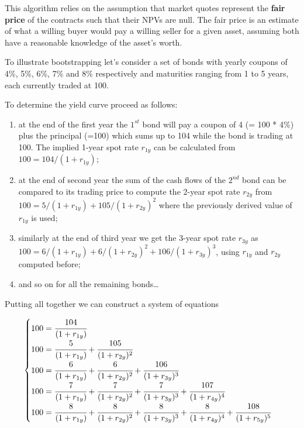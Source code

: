 This algorithm relies on the assumption that market quotes represent the \textbf{fair price} of the contracts such that their NPVs are null. The fair price is an estimate of what a willing buyer would pay a willing seller for a given asset, assuming both have a reasonable knowledge of the asset's worth.

To illustrate bootstrapping let's consider a set of bonds with yearly coupons of 4\%, 5\%, 6\%, 7\% and 8\% respectively and maturities ranging from 1 to 5 years, each currently traded at 100.

To determine the yield curve proceed as follows:
\begin{enumerate}
\item at the end of the first year the $1^{st}$ bond will pay a coupon of 4 (= 100 * 4\%) plus the principal (=100) which sums up to 104 while the bond is 
trading at 100. The implied 1-year spot rate $r_{1y}$ can be calculated from $\mbox{100} = \mbox{104} / (1 + r_{1y})$;
\item at the end of second year the sum of the cash flows of the $2^{nd}$ bond can be compared to its trading price to compute the 2-year spot rate $r_{2y}$ 
from $\mbox{100} = \mbox{5} / (1 + r_{1y}) + \mbox{105} / (1 + r_{2y})^{2}$ where the previously derived value of $r_{1y}$ is used;
\item similarly at the end of third year we get the 3-year spot rate 
$r_{3y}$ as $\mbox{100} = \mbox{6} / (1 + r_{1y}) + \mbox{6} / (1 + r_{2y})^{2} + \mbox{106} / (1 + r_{3y})^{3}$, using $r_{1y}$ and $r_{2y}$ computed before;
\item and so on for all the remaining bonds\ldots
\end{enumerate}

Putting all together we can construct a system of equations

\begin{equation}
\begin{cases}
100 = \cfrac{104}{(1 + r_{1y})} \\
100 = \cfrac{5}{(1 + r_{1y})} + \cfrac{105}{(1 + r_{2y})^{2}} \\
100 = \cfrac{6} {(1 + r_{1y})} + \cfrac{6}{(1 + r_{2y})^{2}} + \cfrac{106} {(1 + r_{3y})^{3}} \\
100 = \cfrac{7} {(1 + r_{1y})} + \cfrac{7} {(1 + r_{2y})^{2}} + \cfrac{7} {(1 + r_{3y})^{3}} + \cfrac{107} {(1 + r_{4y})^{4}} \\
100 = \cfrac{8} {(1 + r_{1y})} + \cfrac{8} {(1 + r_{2y})^{2}}+ \cfrac{8} {(1 + r_{3y})^{3}} + \cfrac{8} {(1 + r_{4y})^{4}} + \cfrac{108} {(1 + r_{5y})^{5}}
\end{cases}
\label{eq:fifth_year_rate}
\end{equation}

